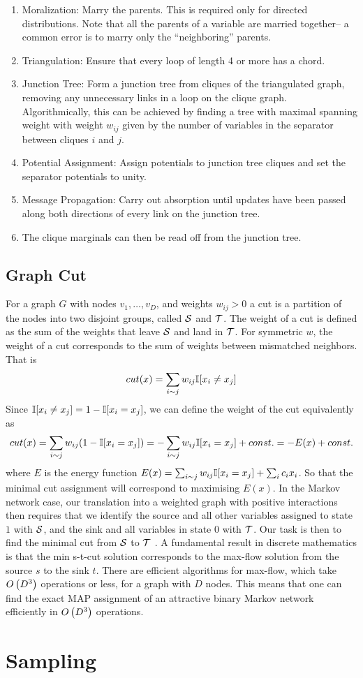 \begin{enumerate}
	\item Moralization: Marry the parents. This is required only for directed distributions. Note that all the parents of a variable are married together-- a common error is to marry only the ``neighboring'' parents.
	\item Triangulation: Ensure that every loop of length 4 or more has a chord.
	\item Junction Tree:  Form a junction tree from cliques of the triangulated graph, removing any unnecessary links in a loop on the clique graph. Algorithmically, this can be achieved by finding a tree with maximal spanning weight with weight $w_{ij}$ given by the number of variables in the separator between cliques $i$ and $j$.
	\item Potential Assignment: Assign potentials to junction tree cliques and set the separator potentials to unity.
	\item Message Propagation: Carry out absorption until updates have been passed along both directions of every link on the junction tree.
	\item The clique marginals can then be read off from the junction tree.
\end{enumerate}

\subsection{Graph Cut}

For a graph $G$ with nodes $v_1,\dotsc,v_D$, and weights $w_{ij}>0$ a cut is a partition of the nodes into two disjoint groups, called $\mathcal{S}$ and $\mathcal{T}$. The weight of a cut is defined as the sum of the weights that leave $\mathcal{S}$ and land in $\mathcal{T}$. For symmetric $w$, the weight of a cut corresponds to the sum of weights between mismatched neighbors. That is
\begin{align*}
	cut(x)=\sum_{i\sim j}w_{ij}\mathbb{I}[x_i\neq x_j]
\end{align*}
Since $\mathbb{I}[x_i\neq x_j]=1-\mathbb{I}[x_i=x_j]$, we can define the weight of the cut equivalently as
\begin{align*}
	cut(x)=\sum_{i\sim j}w_{ij}(1-\mathbb{I}[x_i=x_j])=-\sum_{i\sim j}w_{ij}\mathbb{I}[x_i=x_j]+const.=-E(x)+const.
\end{align*}
where $E$ is the energy function $E(x)=\sum_{i\sim j}w_{ij}\mathbb{I}[x_i=x_j]+\sum_ic_ix_i$. So that the minimal cut assignment will correspond to maximising $E(x)$. In the Markov network case, our translation into a weighted graph with positive interactions then requires that we identify the source and all other variables assigned to state $1$ with $\mathcal{S}$, and the sink and all variables in state $0$ with $\mathcal{T}$. Our task is then to find the minimal cut from $\mathcal{S}$ to $\mathcal{T}$ . A fundamental result in discrete mathematics is that the min s-t-cut solution corresponds to the max-flow solution from the source $s$ to the sink $t$. There are efficient algorithms for max-flow, which take $O\left(D^3\right)$ operations or less, for a graph with $D$ nodes. This means that one can find the exact MAP assignment of an attractive binary Markov network efficiently in $O\left(D^3\right)$ operations.



\section{Sampling}


